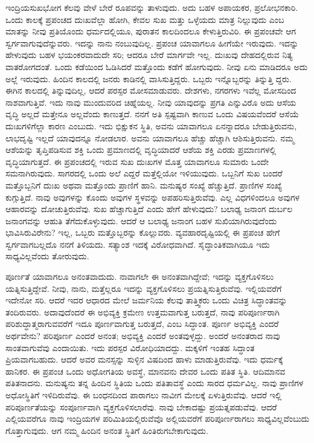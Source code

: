 \vskip 0.2cm 

ಇಂದ್ರಿಯಸುಖಭೋಗ ಕೆಲವು ವೇಳೆ ಬೇರೆ ರೂಪವನ್ನು ತಾಳುವುದು. ಅದು ಬಹಳ ಅಪಾಯಕರ, ಪ್ರಲೋಭನಕಾರಿ. ಒಂದು ಕಾಲಕ್ಕೆ ಪ್ರಪಂಚದ ದುಃಖವೆಲ್ಲಾ ಹೋಗಿ, ಕೇವಲ ಸುಖ ಮತ್ತು ಒಳ್ಳೆಯದು ಮಾತ್ರ ನಿಲ್ಲುವುದು ಎಂಬ ಮಾತನ್ನು ನೀವು ಪ್ರತಿಯೊಂದು ಧರ್ಮದಲ್ಲಿಯೂ, ಪುರಾತನ ಕಾಲದಿಂದಲೂ ಕೇಳುತ್ತಿರುವಿರಿ. ಈ ಪ್ರಪಂಚವೇ ಆಗ ಸ್ವರ್ಗವಾಗುವುದೆನ್ನುವರು. ಇದನ್ನು ನಾನು ನಂಬುವುದಿಲ್ಲ. ಪ್ರಪಂಚ ಯಾವಾಗಲೂ ಹೀಗೆಯೇ ಇರುವುದು. ಇದನ್ನು ಹೇಳುವುದು ಬಹಳ ಭಯಂಕರವಾದುದೇ ಸರಿ; ಆದರೂ ಬೇರೆ ಮಾರ್ಗವೇ ಇಲ್ಲ. ದುಃಖವು ದೇಹದಲ್ಲಿರುವ ನಿತ್ಯ ವಾತರೋಗದಂತೆ. ಒಂದು ಕಡೆಯಿಂದ ಓಡಿಸಿದರೆ ಮತ್ತೊಂದು ಕಡೆಗೆ ಹೋಗುವುದು. ನೀವು ಏನು ಮಾಡಿದರೂ ಅದು ಅಲ್ಲೆ ಇರುವುದು. ಹಿಂದಿನ ಕಾಲದಲ್ಲಿ ಜನರು ಕಾಡಿನಲ್ಲಿ ವಾಸಿಸುತ್ತಿದ್ದರು. ಒಬ್ಬರು ಇನ್ನೊಬ್ಬರನ್ನು ತಿನ್ನುತ್ತಿ ದ್ದರು. ಈಗಿನ ಕಾಲದಲ್ಲಿ ತಿನ್ನುವುದಿಲ್ಲ, ಆದರೆ ಪರಸ್ಪರ ಮೋಸಮಾಡುವರು. ದೇಶಗಳು, ನಗರಗಳು ಇವೆಲ್ಲ ಮೋಸದಿಂದ ನಾಶವಾಗುತ್ತಿವೆ. ಇದು ನಾವು ಮುಂದುವರಿದ ಚಿಹ್ನೆಯಲ್ಲ. ನೀವು ಯಾವುದನ್ನು ಪ್ರಗತಿ ಎನ್ನುವಿರೊ ಅದು ಆಸೆಯ ವೃದ್ಧಿ ಅಲ್ಲದೆ ಮತ್ತೇನೂ ಅಲ್ಲವೆಂದು ಕಾಣುತ್ತದೆ. ನನಗೆ ಅತಿ ಸ್ಪಷ್ಟವಾಗಿ ಕಾಣುವ ಒಂದು ವಿಷಯವೆಂದರೆ ಆಸೆಯೆ ದುಃಖಗಳಿಗೆಲ್ಲಾ ಕಾರಣ ಎಂಬುದು. ಇದು ಭಿಕ್ಷುಕನ ಸ್ಥಿತಿ, ಅವನು ಯಾವಾಗಲೂ ಏನನ್ನಾದರೂ ಬೇಡುತ್ತಿರುವನು, ಲಾಭದೃಷ್ಟಿ ಇಲ್ಲದೆ ಯಾವುದನ್ನೂ ನೋಡಲಾರ. ಅವನು ಯಾವಾಗಲೂ ಹೆಚ್ಚು ಹೆಚ್ಚಾಗಿ ಆಶಿಸುತ್ತಿರುವನು. ನಮ್ಮ ಆಶೆಯನ್ನು ತೃಪ್ತಿಪಡಿಸುವ ಶಕ್ತಿ ಒಂದು ಪ್ರಮಾಣದಲ್ಲಿ ವೃದ್ಧಿಯಾದರೆ ಆಶೆಯ ಶಕ್ತಿ ಎರಡು ಪ್ರಮಾಣಗಳಲ್ಲಿ ವೃದ್ಧಿಯಾಗುತ್ತದೆ. ಈ ಪ್ರಪಂಚದಲ್ಲಿ ಇರುವ ಸುಖ ದುಃಖಗಳ ಮೊತ್ತ ಯಾವಾಗಲೂ ಸುಮಾರು ಒಂದೇ ಸಮನಾಗಿರುವುದು. ಸಾಗರದಲ್ಲಿ ಒಂದು ಅಲೆ ಎದ್ದರೆ ಮತ್ತೆಲ್ಲಿಯೋ ಇಳಿಯುವುದು. ಒಬ್ಬನಿಗೆ ಸುಖ ಬಂದರೆ ಮತ್ತೊಬ್ಬನಿಗೆ ದುಃಖ ಅಥವಾ ಮತ್ತೊಂದು ಪ್ರಾಣಿಗೆ ಹಾನಿ. ಮನುಷ್ಯರ ಸಂಖ್ಯೆ ಹೆಚ್ಚುತ್ತಿದೆ. ಪ್ರಾಣಿಗಳ ಸಂಖ್ಯೆ ಕುಗ್ಗುತ್ತಿದೆ. ನಾವು ಅವುಗಳನ್ನು ಕೊಂದು ಅವುಗಳ ಸ್ಥಳವನ್ನು ಅಪಹರಿಸುತ್ತಿರುವೆವು. ಎಲ್ಲ ವಿಧಗಳಿಂದಲೂ ಅವುಗಳ ಆಹಾರವನ್ನು ದೋಚುತ್ತಿರುವೆವು. ಸುಖ ಹೆಚ್ಚಾಗುತ್ತಿದೆ ಎಂದು ಹೇಗೆ ಹೇಳುವುದು? ಬಲಾಢ್ಯ ಜನಾಂಗ ದುರ್ಬಲ ಜನಾಂಗವನ್ನು ಆಹುತಿ ತೆಗೆದುಕೊಳ್ಳುವುದು. ಆದರೆ ಆ ಬಲಾಢ್ಯ ಜನಾಂಗ ಬಹಳ ಸುಖಿಯಾಗಿರುವುದೆಂದು ಭಾವಿಸಿರುವಿರೇನು? ಇಲ್ಲ, ಒಬ್ಬರು ಮತ್ತೊಬ್ಬರನ್ನು ಕೊಲ್ಲುವರು. ವ್ಯವಹಾರದೃಷ್ಟಿಯಲ್ಲಿ ಈ ಪ್ರಪಂಚ ಹೇಗೆ ಸ್ವರ್ಗವಾಗಬಲ್ಲದೊ ನನಗೆ ತಿಳಿಯದು. ಸತ್ಯಾಂಶ ಇದಕ್ಕೆ ವಿರೋಧವಾಗಿದೆ. ಸೈದ್ಧಾಂತಿಕವಾಗಿಯೂ ಇದು ಸಾಧ್ಯವಿಲ್ಲವೆಂದು ತೋರುವುದು.

\vskip 0.2cm 

ಪೂರ್ಣತೆ ಯಾವಾಗಲೂ ಅನಂತವಾದುದು. ನಾವಾಗಲೇ ಈ ಅನಂತವಾಗಿದ್ದೇವೆ; ಇದನ್ನು ವ್ಯಕ್ತಗೊಳಿಸಲು ಯತ್ನಿಸುತ್ತಿದ್ದೇವೆ. ನೀವು, ನಾನು, ಮತ್ತೆಲ್ಲರೂ ಇದನ್ನು ವ್ಯಕ್ತಗೊಳಿಸಲು ಪ್ರಯತ್ನಿಸುತ್ತಿರುವೆವು. ಇಲ್ಲಿಯವರೆಗೆ ಇದೇನೋ ಸರಿ. ಆದರೆ ಇದರ ಆಧಾರದ ಮೇಲೆ ಜರ್ಮನಿಯ ಕೆಲವು ತಾತ್ತ್ವಿಕರು ಒಂದು ವಿಚಿತ್ರ ಸಿದ್ಧಾಂತವನ್ನು ತಂದಿರುವರು. ಅದಾವುದೆಂದರೆ ಈ ಅಭಿವ್ಯಕ್ತಿ ಕ್ರಮೇಣ ಉತ್ತಮವಾಗುತ್ತ ಬರುತ್ತದೆ, ನಾವು ಪರಿಪೂರ್ಣರಾಗಿ ಪರಿಶುದ್ಧಾತ್ಮರಾಗುವವರೆಗೆ ಇದೂ ಪೂರ್ಣವಾಗುತ್ತ ಬರುತ್ತದೆ, ಎಂಬ ಸಿದ್ಧಾಂತ. ಪೂರ್ಣ ಅಭಿವ್ಯಕ್ತಿ ಎಂದರೆ ಅರ್ಥವೇನು? ಪರಿಪೂರ್ಣ ಎಂದರೆ ಅನಂತ; ಅಭಿವ್ಯಕ್ತಿ ಎಂದರೆ ಅಂತವುಳ್ಳದ್ದು. ಅಂದರೆ ಅನಂತರಾದ ನಾವು ಸಾಂತವಾಗುವೆವು ಎಂದಾಯಿತು. ಇದು ಪರಸ್ಪರ ವಿರೋಧಿಯಾದದ್ದು. ಮಕ್ಕಳಿಗೆ ಇಂತಹ ಸಿದ್ಧಾಂತ ಪ್ರಿಯವಾಗಬಹುದು. ಆದರೆ ಅವರ ಮನಸ್ಸನ್ನು ಸುಳ್ಳಿನ ವಿಷದಿಂದ ಹಾಳು ಮಾಡುತ್ತಿರುವೆವು. ಇದು ಧರ್ಮಕ್ಕೆ ಹಾನಿಕರ. ಈ ಪ್ರಪಂಚ ಒಂದು ಅಧೋಗತಿಯ ಅವಸ್ಥೆ, ಮಾನವನು ದೇವರ ಒಂದು ಪತಿತ ಸ್ಥಿತಿ. ಆದಿಮಾನವ ಪತಿತನಾದನು. ಮನುಷ್ಯನು ತನ್ನ ಹಿಂದಿನ ಸ್ಥಿತಿಯ ಒಂದು ಪತಿತಾವಸ್ಥೆ ಎಂದು ಸಾರದ ಧರ್ಮವಿಲ್ಲ. ನಾವು ಪ್ರಾಣಿಗಳ ಅಧೋಸ್ಥಿತಿಗೆ ಇಳಿದಿರುವೆವು. ಈ ಬಂಧನದಿಂದ ಪಾರಾಗಲು ನಾವೀಗ ಮೇಲಕ್ಕೆ ಏಳುತ್ತಿರುವೆವು. ಆದರೆ ಇಲ್ಲಿ ಪರಿಪೂರ್ಣತೆಯನ್ನು ಸಂಪೂರ್ಣವಾಗಿ ವ್ಯಕ್ತಗೊಳಿಸಲಾರೆವು. ನಾವು ಬೇಕಾದಷ್ಟು ಪ್ರಯತ್ನಪಡುವೆವು. ಆದರೆ ಎಲ್ಲಿಯವರೆಗೂ ನಾವು ಇಂದ್ರಿಯಗಳ ಪರಿಮಿತಿಯಲ್ಲಿರುವೆವೊ ಅಲ್ಲಿಯವರೆಗೆ ಪರಿಪೂರ್ಣರಾಗಲು ಸಾಧ್ಯವಿಲ್ಲವೆಂಬುದು ಗೊತ್ತಾಗುವುದು. ಆಗ ನಮ್ಮ ಹಿಂದಿನ ಅನಂತ ಸ್ಥಿತಿಗೆ ಹಿಂತಿರುಗಬೇಕಾಗುವುದು.

